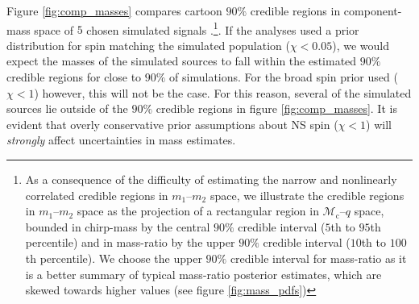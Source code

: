 Figure \ref{fig:comp_masses} compares cartoon $90\%$ credible regions in component-mass space of $5$ chosen simulated signals \citep[cf.][figure 1]{Chatziioannou_2014}.\footnote{As a consequence of the difficulty of estimating the narrow and nonlinearly correlated credible regions in $m_1$--$m_2$ space, we illustrate the credible regions in $m_1$--$m_2$ space as the projection of a rectangular region in $\mathcal{M}_\mathrm{c}$--$q$ space, bounded in chirp-mass by the central $90\%$ credible interval ($5$th to $95$th percentile) and in mass-ratio by the upper $90\%$ credible interval ($10$th to $100$th percentile).  We choose the upper $90\%$ credible interval for mass-ratio as it is a better summary of typical mass-ratio posterior estimates, which are skewed towards higher values (see figure \ref{fig:mass_pdfs})}. If the analyses used a prior distribution for spin matching the simulated population ($\chi < 0.05$), we would expect the masses of the simulated sources to fall within the estimated $90\%$ credible regions for close to $90\%$ of simulations. For the broad spin prior used ($\chi < 1$) however, this will not be the case.  For this reason, several of the simulated sources lie outside of the $90\%$ credible regions in figure \ref{fig:comp_masses}.  It is evident that overly conservative prior assumptions about NS spin ($\chi < 1$) will \textit{strongly} affect uncertainties in mass estimates.